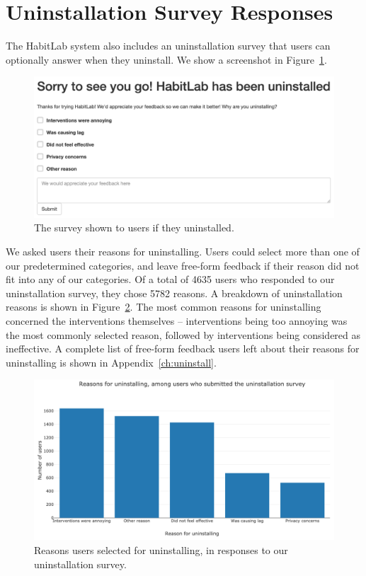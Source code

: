 \section{Uninstallation Survey Responses}

The HabitLab system also includes an uninstallation survey that users can optionally answer when they uninstall. We show a screenshot in Figure~\ref{fig:uninstall_survey}.

\begin{figure}
\includegraphics[width=\linewidth]{figuresS/uninstall_survey}
\caption{The survey shown to users if they uninstalled.}
  \label{fig:uninstall_survey}
\end{figure}

We asked users their reasons for uninstalling. Users could select more than one of our predetermined categories, and leave free-form feedback if their reason did not fit into any of our categories. Of a total of 4635 users who responded to our uninstallation survey, they chose 5782 reasons. A breakdown of uninstallation reasons is shown in Figure~\ref{fig:uninstall_reasons}. The most common reasons for uninstalling concerned the interventions themselves -- interventions being too annoying was the most commonly selected reason, followed by interventions being considered as ineffective. A complete list of free-form feedback users left about their reasons for uninstalling is shown in Appendix~\ref{ch:uninstall}.

\begin{figure}
\includegraphics[width=\linewidth]{figuresS/uninstall_reasons}
\caption{Reasons users selected for uninstalling, in responses to our uninstallation survey.}
  \label{fig:uninstall_reasons}
\end{figure}

